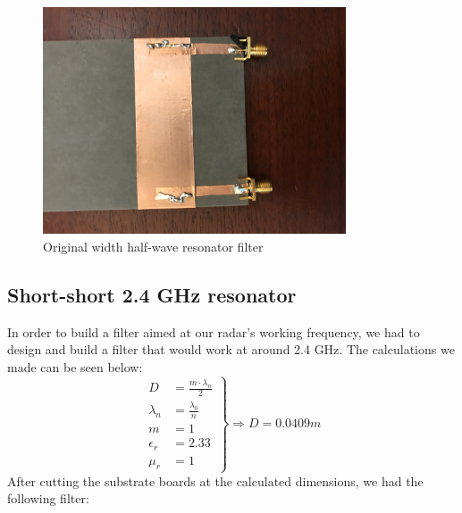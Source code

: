 \documentclass[letterpaper, 12pt]{article}
\begin{document}
\begin{figure}[H]
    \centering
    \includegraphics[width=0.8\textwidth, angle = 270]{filter1}
    \caption{Original width half-wave resonator filter}
\end{figure}
\subsection{Short-short 2.4 GHz resonator}
In order to build a filter aimed at our radar's working frequency, we had to design and build a filter that would work at around 2.4 GHz. The calculations we made can be seen below:
\begin{equation*}
\left.
\begin{aligned}
    D&=\frac{m\cdot\lambda_n}{2} \\
    \lambda_n&=\frac{\lambda_0}{n}\\
    m&=1 \\
    \epsilon_r&=2.33 \\
    \mu_r&=1
\end{aligned}
\right \}
\Longrightarrow
D=0.0409m
\end{equation*}
After cutting the substrate boards at the calculated dimensions, we had the following filter:
\end{document}
